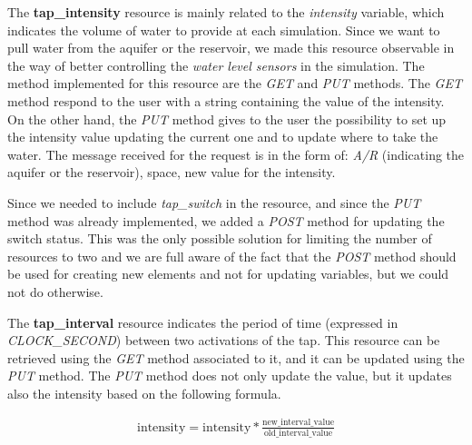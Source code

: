 The \textbf{tap\_intensity} resource is mainly related to the \textit{intensity} variable, which indicates the volume of water to provide at each simulation. Since we want to pull water from the aquifer or the reservoir, we made this resource observable in the way of better controlling the \textit{water level sensors} in the simulation. The method implemented for this resource are the \textit{GET} and \textit{PUT} methods. The \textit{GET} method respond to the user with a string containing the value of the intensity. On the other hand, the \textit{PUT} method gives to the user the possibility to set up the intensity value updating the current one and to update where to take the water. The message received for the request is in the form of: \textit{A/R} (indicating the aquifer or the reservoir), space, new value for the intensity. 

Since we needed to include \textit{tap\_switch} in the resource, and since the \textit{PUT} method was already implemented, we added a \textit{POST} method for updating the switch status. This was the only possible solution for limiting the number of resources to two and we are full aware of the fact that the \textit{POST} method should be used for creating new elements and not for updating variables, but we could not do otherwise.

The \textbf{tap\_interval} resource indicates the period of time (expressed in \textit{CLOCK\_SECOND}) between two activations of the tap. This resource can be retrieved using the \textit{GET} method associated to it, and it can be updated using the \textit{PUT} method. The \textit{PUT} method does not only update the value, but it updates also the intensity based on the following formula.

\begin{equation}\label{eq1}
  \begin{gathered}
    \text{intensity} = \text{intensity} * \frac{\text{new\_interval\_value}}{\text{old\_interval\_value}}
  \end{gathered}
\end{equation}